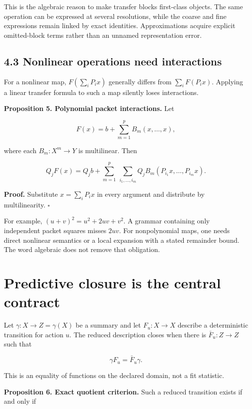 This is the algebraic reason to make transfer blocks first-class
objects. The same operation can be expressed at several resolutions,
while the coarse and fine expressions remain linked by exact identities.
Approximations acquire explicit omitted-block terms rather than an
unnamed representation error.

\subsection{4.3 Nonlinear operations need
interactions}\label{LSM:nonlinear-operations-need-interactions}

For a nonlinear map, \(F(\sum_iP_ix)\) generally differs from
\(\sum_iF(P_ix)\). Applying a linear transfer formula to such a map
silently loses interactions.

\textbf{Proposition 5. Polynomial packet interactions.} Let

\[
F(x)=b+\sum_{m=1}^{p}B_m(x,\ldots,x),
\]

where each \(B_m:X^m\to Y\) is multilinear. Then

\[
Q_jF(x)=Q_jb+
\sum_{m=1}^{p}\ \sum_{i_1,\ldots,i_m}
Q_jB_m(P_{i_1}x,\ldots,P_{i_m}x).
\]

\textbf{Proof.} Substitute \(x=\sum_iP_ix\) in every argument and
distribute by multilinearity. \(\square\)

For example, \((u+v)^2=u^2+2uv+v^2\). A grammar containing only
independent packet squares misses \(2uv\). For nonpolynomial maps, one
needs direct nonlinear semantics or a local expansion with a stated
remainder bound. The word algebraic does not remove that obligation.

\section{Predictive closure is the central contract}\label{LSM:predictive-closure-is-the-central-contract}

Let \(\gamma:X\to Z=\gamma(X)\) be a summary and let \(F_u:X\to X\)
describe a deterministic transition for action \(u\). The reduced
description closes when there is \(\bar F_u:Z\to Z\) such that

\[
\gamma F_u=\bar F_u\gamma.
\]

This is an equality of functions on the declared domain, not a fit
statistic.

\textbf{Proposition 6. Exact quotient criterion.} Such a reduced
transition exists if and only if

